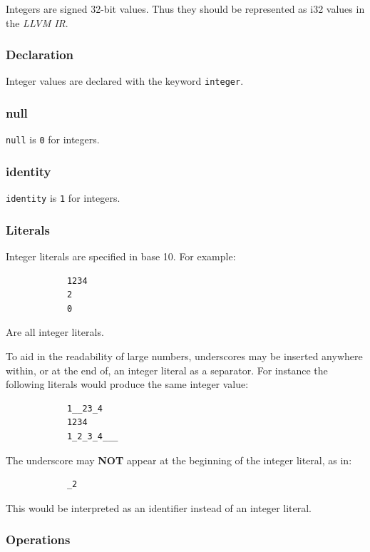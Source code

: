 \documentclass{article}
\begin{document}
		Integers are signed 32-bit values. Thus they should be represented as i32 values in the \textit{LLVM IR}.

	\subsubsection{Declaration}

		Integer values are declared with the keyword \texttt{integer}.

	\subsubsection{null}

		\texttt{null} is \texttt{0} for integers.

	\subsubsection{identity}

		\texttt{identity} is \texttt{1} for integers.

	\subsubsection{Literals}
  \label{sssec:int_lit}

		Integer literals are specified in base 10. For example:

		\begin{lstlisting}
			1234
			2
			0
		\end{lstlisting}

		Are all integer literals.

		To aid in the readability of large numbers, underscores may be inserted anywhere within, or at the end of, an
		integer literal as a separator. For instance the following literals would produce the same integer value:

		\begin{lstlisting}
			1__23_4
			1234
			1_2_3_4___
		\end{lstlisting}

		The underscore may \textbf{NOT} appear at the beginning of the integer literal, as in:

		\begin{lstlisting}
			_2
		\end{lstlisting}

		This would be interpreted as an identifier instead of an integer literal.

	\subsubsection{Operations}
\end{document}
